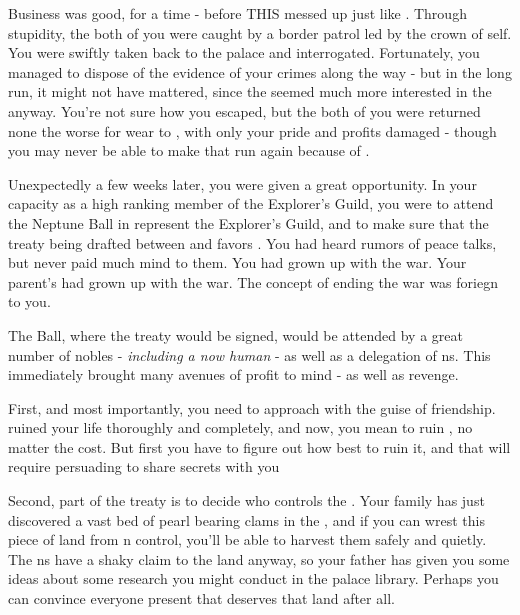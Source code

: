 \documentclass[char]{NeptuneBall}
\begin{document}
Business was good, for a time - before THIS \cPrincess{\prince} messed up just like \cPrincess{\their} \cAriel{\sibling}. Through \cPrincess{\their} stupidity, the both of you were caught by a border patrol led by the crown \cPrince{\Prince} of \pPacifica{} \cPrince{\them}self. You were swiftly taken back to the palace and interrogated. Fortunately, you managed to dispose of the evidence of your crimes along the way - but in the long run, it might not have mattered, since the \cPrince{\prince} seemed much more interested in the \cPrincess{\prince} anyway. You're not sure how you escaped, but the both of you were returned none the worse for wear to \pAtlantis{}, with only your pride and profits damaged - though you may never be able to make that run again because of \emph{\cPrincess{\them}}.
 
Unexpectedly a few weeks later, you were given a great opportunity. In your capacity as a high ranking member of the Explorer's Guild, you were to attend the Neptune Ball in represent the Explorer's Guild, and to make sure that the treaty being drafted between \pPacifica{} and \pAtlantis{} favors \pAtlantis{}. You had heard rumors of peace talks, but never paid much mind to them. You had grown up with the war. Your parent's had grown up with the war. The concept of ending the war was foriegn to you. 

The \cExExKing{} Ball, where the treaty would be signed, would be attended by a great number of nobles - \emph{including a now human \cAriel{}} - as well as a delegation of \pPacifica{}ns. This immediately brought many avenues of profit to mind - as well as revenge.

First, and most importantly, you need to approach \cAriel{} with the guise of friendship. \cAriel{\They} ruined your life thoroughly and completely, and now, you mean to ruin \cAriel{\their}, no matter the cost. But first you have to figure out how best to ruin it, and that will require persuading \cAriel{} to share \cAriel{\them} secrets with you

Second, part of the treaty is to decide who controls the \pGazaStrip{}. Your family has just discovered a vast bed of pearl bearing clams in the \ptrench{}, and if you can wrest this piece of land from \pPacifica{}n control, you'll be able to harvest them safely and quietly. The \pPacifica{}ns have a shaky claim to the land anyway, so your father has given you some ideas about some research you might conduct in the palace library. Perhaps you can convince everyone present that \pAtlantis{} deserves that land after all.
\end{document}
